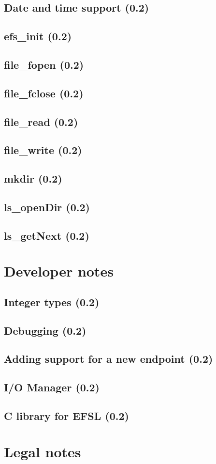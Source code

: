\documentclass[a4paper,fleqn]{article}
\begin{document}
\subsection{Date and time support (0.2)}
	
	\newpage
\subsection{efs\_init (0.2)}
	
	\newpage
\subsection{file\_fopen (0.2)}
	
	\newpage
\subsection{file\_fclose (0.2)}
	
	\newpage
\subsection{file\_read (0.2)}
	
	\newpage
\subsection{file\_write (0.2)}
	
	\newpage
\subsection{mkdir (0.2)}
	
	\newpage
\subsection{ls\_openDir (0.2)}
	
	\newpage
\subsection{ls\_getNext (0.2)}
	
	\newpage

\newpage
\section{Developer notes}
\subsection{Integer types (0.2)}
	
\subsection{Debugging (0.2)}
	
\subsection{Adding support for a new endpoint (0.2)}
	
\subsection{I/O Manager (0.2)}
	
\subsection{C library for EFSL (0.2)}
	

\newpage
\section{Legal notes}
	
\end{document}

